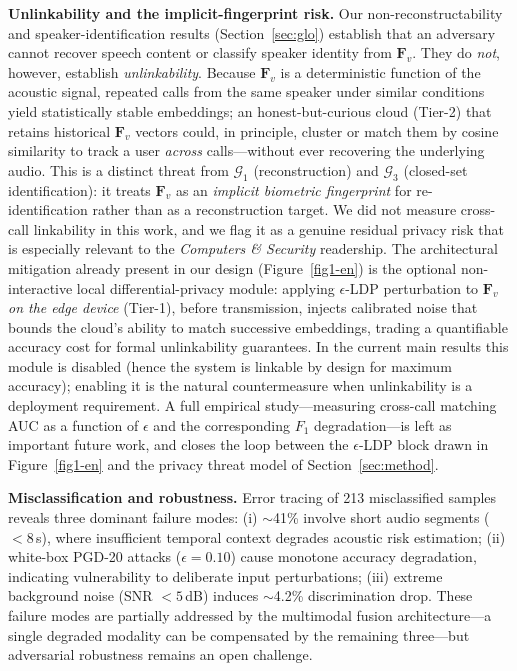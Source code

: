 \documentclass[final,5p,times,number]{elsarticle}
\begin{document}
\textbf{Unlinkability and the implicit-fingerprint risk.} Our non-reconstructability and speaker-identification results (Section~\ref{sec:glo}) establish that an adversary cannot recover speech content or classify speaker identity from $\bm{F}_v$. They do \emph{not}, however, establish \emph{unlinkability}. Because $\bm{F}_v$ is a deterministic function of the acoustic signal, repeated calls from the same speaker under similar conditions yield statistically stable embeddings; an honest-but-curious cloud (Tier-2) that retains historical $\bm{F}_v$ vectors could, in principle, cluster or match them by cosine similarity to track a user \emph{across} calls---without ever recovering the underlying audio. This is a distinct threat from $\mathcal{G}_1$ (reconstruction) and $\mathcal{G}_3$ (closed-set identification): it treats $\bm{F}_v$ as an \emph{implicit biometric fingerprint} for re-identification rather than as a reconstruction target. We did not measure cross-call linkability in this work, and we flag it as a genuine residual privacy risk that is especially relevant to the \emph{Computers \& Security} readership. The architectural mitigation already present in our design (Figure~\ref{fig1-en}) is the optional non-interactive local differential-privacy module: applying $\epsilon$-LDP perturbation to $\bm{F}_v$ \emph{on the edge device} (Tier-1), before transmission, injects calibrated noise that bounds the cloud's ability to match successive embeddings, trading a quantifiable accuracy cost for formal unlinkability guarantees. In the current main results this module is disabled (hence the system is linkable by design for maximum accuracy); enabling it is the natural countermeasure when unlinkability is a deployment requirement. A full empirical study---measuring cross-call matching AUC as a function of $\epsilon$ and the corresponding $F_1$ degradation---is left as important future work, and closes the loop between the $\epsilon$-LDP block drawn in Figure~\ref{fig1-en} and the privacy threat model of Section~\ref{sec:method}.

\textbf{Misclassification and robustness.} Error tracing of 213 misclassified samples reveals three dominant failure modes: (i) $\sim$41\% involve short audio segments ($<8$\,s), where insufficient temporal context degrades acoustic risk estimation; (ii) white-box PGD-20 attacks ($\epsilon=0.10$) cause monotone accuracy degradation, indicating vulnerability to deliberate input perturbations; (iii) extreme background noise (SNR $<5$\,dB) induces $\sim$4.2\% discrimination drop. These failure modes are partially addressed by the multimodal fusion architecture---a single degraded modality can be compensated by the remaining three---but adversarial robustness remains an open challenge.
\end{document}
